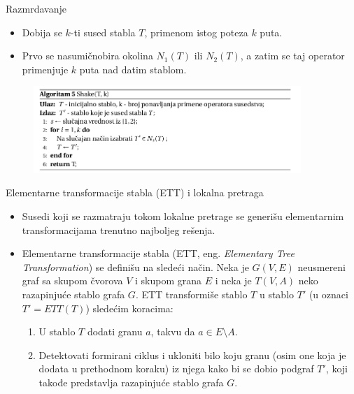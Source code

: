 \documentclass{beamer}
\begin{document}
\begin{frame}{Razmrdavanje}
\begin{itemize}
    \small
    \item Dobija se $k$-ti sused stabla $T$, primenom istog poteza $k$ puta.
    \item Prvo se nasumičnobira okolina $N_1(T)$ ili $N_2(T)$, a zatim se taj operator primenjuje $k$ puta nad datim stablom.
\end{itemize}
\begin{figure}[!ht]
\begin{center}
\includegraphics[width=0.9\textwidth]{images/shake_alg.png}
\end{center}
\label{fig:mutation}
\end{figure}
\end{frame}

\begin{frame}{Elementarne transformacije stabla (ETT) i lokalna pretraga}
\begin{itemize}
\small
    \item Susedi koji se razmatraju tokom lokalne pretrage se generišu elementarnim transformacijama trenutno najboljeg rešenja.
    \item Elementarne transformacije stabla (ETT, eng. \textit{Elementary Tree Transformation}) se definišu na sledeći način. Neka je $G(V, E)$ neusmereni graf sa skupom čvorova $V$ i skupom grana $E$ i neka je $T(V, A)$ neko razapinjuće stablo grafa $G$. ETT transformiše stablo $T$ u stablo $T'$ (u oznaci $T' = ETT(T)$) sledećim koracima:
    \begin{enumerate}
        \item U stablo $T$ dodati granu $a$, takvu da $a \in E \setminus A$.
        \item Detektovati formirani ciklus i ukloniti bilo koju granu (osim one koja je dodata u prethodnom koraku) iz njega kako bi se dobio podgraf $T'$, koji takođe predstavlja razapinjuće stablo grafa $G$.
    \end{enumerate}
\end{itemize}
\end{frame}
\end{document}
